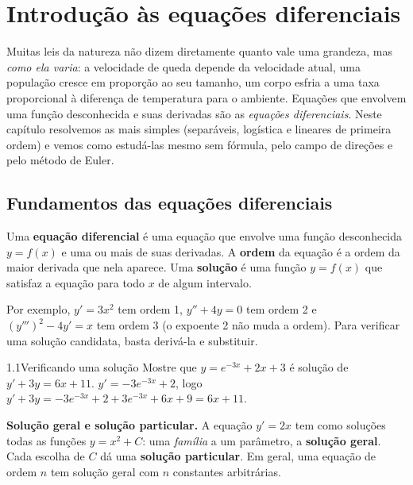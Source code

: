 \chapter{Introdução às equações diferenciais}

Muitas leis da natureza não dizem diretamente quanto vale uma grandeza, mas \emph{como ela
varia}: a velocidade de queda depende da velocidade atual, uma população cresce em proporção
ao seu tamanho, um corpo esfria a uma taxa proporcional à diferença de temperatura para o
ambiente. Equações que envolvem uma função desconhecida e suas derivadas são as
\emph{equações diferenciais}. Neste capítulo resolvemos as mais simples (separáveis, logística
e lineares de primeira ordem) e vemos como estudá-las mesmo sem fórmula, pelo campo de
direções e pelo método de Euler.

\section{Fundamentos das equações diferenciais}

\begin{definicao}
Uma \textbf{equação diferencial} é uma equação
que envolve uma função desconhecida $y=f(x)$ e uma ou mais de suas derivadas. A
\textbf{ordem} da equação é a ordem da maior derivada
que nela aparece. Uma \textbf{solução} é uma função $y=f(x)$ que satisfaz a equação para todo
$x$ de algum intervalo.
\end{definicao}

Por exemplo, $y'=3x^2$ tem ordem 1, $y''+4y=0$ tem ordem 2 e $(y''')^2-4y'=x$ tem ordem 3
(o expoente 2 não muda a ordem). Para verificar uma solução candidata, basta derivá-la e
substituir.

\begin{exemplo}{1.1}{Verificando uma solução}
Mostre que $y=e^{-3x}+2x+3$ é solução de $y'+3y=6x+11$.
\solucao
$y'=-3e^{-3x}+2$, logo $y'+3y=-3e^{-3x}+2+3e^{-3x}+6x+9=6x+11$. \checkmark
\end{exemplo}

\textbf{Solução geral e solução particular.} A equação $y'=2x$ tem como soluções todas as
funções $y=x^2+C$: uma \emph{família} a um parâmetro, a \textbf{solução geral}. Cada escolha de $C$ dá uma \textbf{solução particular}. Em geral, uma
equação de ordem $n$ tem solução geral com $n$ constantes arbitrárias.

